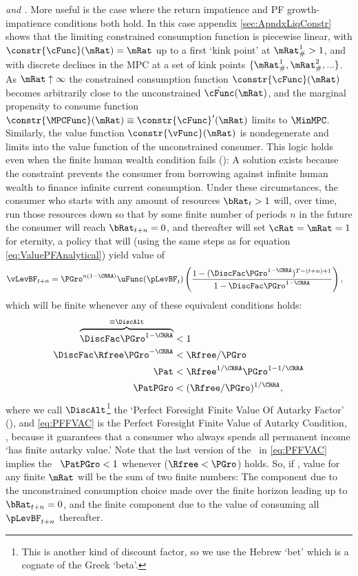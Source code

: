 \documentclass[BufferStockTheory]{subfiles}
\begin{document}
\textit{{\PFGIC} and {\RIC}.}  More useful is the case where the return impatience and PF growth-impatience conditions both hold.  In this case appendix \ref{sec:ApndxLiqConstr} shows that the limiting constrained consumption function is piecewise linear, with $\constr{\cFunc}(\mRat)=\mRat$ up to a first `kink point' at $\mRat_{\#}^{1}>1$, and with discrete declines in the MPC at a set of kink points $\{\mRat_{\#}^{1},\mRat_{\#}^{2},...\}$.  As $\mRat \uparrow \infty$ the constrained consumption function $\constr{\cFunc}(\mRat)$ becomes arbitrarily close to the unconstrained $\bar{\cFunc}(\mRat)$, and the marginal propensity to consume function $\constr{\MPCFunc}(\mRat) \equiv \constr{\cFunc}^{\prime}(\mRat)$ limits to $\MinMPC$.  Similarly, the value function $\constr{\vFunc}(\mRat)$ is nondegenerate and limits into the value function of the unconstrained consumer.  This logic holds even when the finite human wealth condition fails (\cncl{\FHWC}):  A solution exists because the constraint prevents the consumer from borrowing against infinite human wealth to finance infinite current consumption.  Under these circumstances, the consumer who starts with any amount of resources $\bRat_{t} > 1$ will, over time, run those resources down so that by some finite number of periods $n$ in the future the consumer will reach $\bRat_{t+n} = 0$, and thereafter will set $\cRat = \mRat = 1$ for eternity, a policy that will (using the same steps as for equation \eqref{eq:ValuePFAnalytical}) yield value of \hypertarget{PFFVAC}{} \hypertarget{PFFVAF}{}
\begin{align*}
  \vLevBF_{t+n} %
 & = \PGro^{n(1-\CRRA)} \uFunc(\pLevBF_{t})\left(\frac{1-(\DiscFac
        \PGro^{1-\CRRA})^{T-(t+n)+1}}{1-\DiscFac \PGro^{1-\CRRA}}\right),
\end{align*}
which will be finite whenever any of these equivalent conditions holds:
\begin{align}
  \overbrace{\DiscFac \PGro^{1-\CRRA} }^{\equiv \DiscAlt}  & < 1  \nonumber 
  \\ \DiscFac \Rfree \PGro^{-\CRRA}  & < \Rfree/\PGro \label{eq:PFFVAC} 
  \\ \Pat      & < \Rfree^{1/\CRRA}\PGro^{1-1/\CRRA}  \nonumber
  \\ \PatPGro  & < (\Rfree/\PGro)^{1/\CRRA},  \nonumber
\end{align}
where we call $\DiscAlt$\footnote{This is another kind of discount factor, so we use the Hebrew `bet' which is a cognate of the Greek `beta'.} the `Perfect Foresight Finite Value Of Autarky Factor' ({\PFVAF}), and \eqref{eq:PFFVAC} is the Perfect Foresight Finite Value of Autarky Condition, \PFFVAC, because it guarantees that a consumer who always spends all permanent income `has finite autarky value.'  Note that the last version of the \PFFVAC~in \eqref{eq:PFFVAC} implies the \PFGIC~$\PatPGro < 1$ whenever \cncl{\FHWC} ($\Rfree < \PGro$) holds.  So, if \cncl{\FHWC}, value for any finite $\mRat$ will be the sum of two finite numbers: The component due to the unconstrained consumption choice made over the finite horizon leading up to $\bRat_{t+n} = 0$, and the finite component due to the value of consuming all $\pLevBF_{t+n}$ thereafter.
\end{document}

